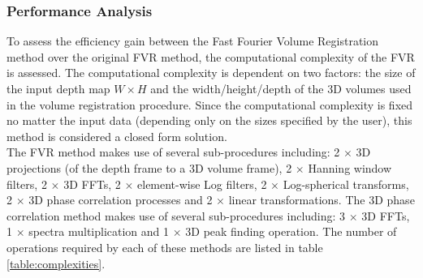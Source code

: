 \subsubsection{Performance Analysis}

To assess the efficiency gain between the Fast Fourier Volume Registration method over the original FVR method, the computational complexity of the FVR is assessed. The computational complexity is dependent on two factors: the size of the input depth map $W \times H$ and the width/height/depth of the 3D volumes used in the volume registration procedure. Since the computational complexity is fixed no matter the input data (depending only on the sizes specified by the user), this method is considered a closed form solution. \\

The FVR method makes use of several sub-procedures including: 2 $\times$ 3D projections (of the depth frame to a 3D volume frame), 2 $\times$ Hanning window filters, 2 $\times$ 3D FFTs, 2 $\times$ element-wise Log filters, 2 $\times$ Log-spherical transforms, 2 $\times$ 3D phase correlation processes and 2 $\times$ linear transformations. The 3D phase correlation method makes use of several sub-procedures including: 3 $\times$ 3D FFTs, 1 $\times$ spectra multiplication and 1 $\times$ 3D peak finding operation. The number of operations required by each of these methods are listed in table \ref{table:complexities}. \\


\begin{table}[ht]
\centering
\caption{Complexities for given Procedures}
\\
\label{table:complexities}
\end{table}


